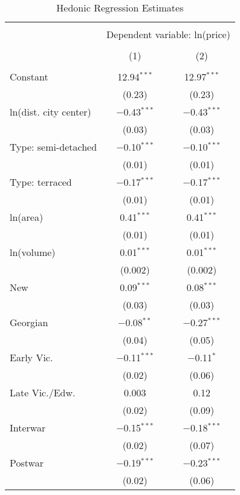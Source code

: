 
\begin{table}[!htbp] \centering 
  \caption{Hedonic Regression Estimates} 
  \label{tab:hedreg} 
\footnotesize 
\begin{tabular}{@{\extracolsep{5pt}}lcc} 
\\[-1.8ex]\hline 
\hline \\[-1.8ex] 
 & \multicolumn{2}{c}{Dependent variable: ln(price)} \\ 
\cline{2-3} 
\\[-1.8ex] & (1) & (2)\\ 
\hline \\[-1.8ex] 
 Constant & 12.94$^{***}$ & 12.97$^{***}$ \\ 
  & (0.23) & (0.23) \\ 
  ln(dist. city center) & $-$0.43$^{***}$ & $-$0.43$^{***}$ \\ 
  & (0.03) & (0.03) \\ 
  Type: semi-detached & $-$0.10$^{***}$ & $-$0.10$^{***}$ \\ 
  & (0.01) & (0.01) \\ 
  Type: terraced & $-$0.17$^{***}$ & $-$0.17$^{***}$ \\ 
  & (0.01) & (0.01) \\ 
  ln(area) & 0.41$^{***}$ & 0.41$^{***}$ \\ 
  & (0.01) & (0.01) \\ 
  ln(volume) & 0.01$^{***}$ & 0.01$^{***}$ \\ 
  & (0.002) & (0.002) \\ 
  New & 0.09$^{***}$ & 0.08$^{***}$ \\ 
  & (0.03) & (0.03) \\ 
  Georgian & $-$0.08$^{**}$ & $-$0.27$^{***}$ \\ 
  & (0.04) & (0.05) \\ 
  Early Vic. & $-$0.11$^{***}$ & $-$0.11$^{*}$ \\ 
  & (0.02) & (0.06) \\ 
  Late Vic./Edw. & 0.003 & 0.12 \\ 
  & (0.02) & (0.09) \\ 
  Interwar & $-$0.15$^{***}$ & $-$0.18$^{***}$ \\ 
  & (0.02) & (0.07) \\ 
  Postwar & $-$0.19$^{***}$ & $-$0.23$^{***}$ \\ 
  & (0.02) & (0.06) \\ 

\end{tabular}
\end{table}
